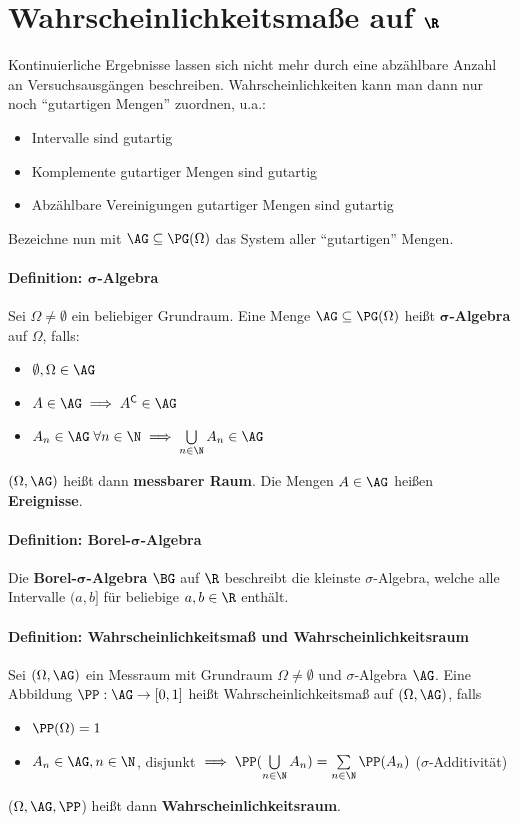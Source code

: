 \section{Wahrscheinlichkeitsmaße auf $\pmb{\R}$}
Kontinuierliche Ergebnisse lassen sich nicht mehr durch eine abzählbare Anzahl an Versuchsausgängen beschreiben.
Wahrscheinlichkeiten kann man dann nur noch \enquote{gutartigen Mengen} zuordnen, u.a.:
\begin{itemize}
	\item Intervalle sind gutartig
	\item Komplemente gutartiger Mengen sind gutartig
	\item Abzählbare Vereinigungen gutartiger Mengen sind gutartig
\end{itemize}
Bezeichne nun mit $\AG\subseteq\PG(\Omega)$ das System aller \enquote{gutartigen} Mengen.

\paragraph{Definition: $\pmb{\sigma}$-Algebra}
Sei $\Omega\neq\emptyset$ ein beliebiger Grundraum. Eine Menge $\AG\subseteq\PG(\Omega)$ heißt $\pmb{\sigma}$\textbf{-Algebra} auf $\Omega$, falls:
\begin{itemize}
	\item $\emptyset,\Omega\in\AG$
	\item $A\in\AG\implies A^{\mathsf{C}}\in\AG$
	\item $A_n\in\AG\;\forall n\in\N\implies\bigcup\limits_{n\in\N}A_n\in\AG$
\end{itemize}
$(\Omega,\AG)$ heißt dann \textbf{messbarer Raum}.
Die Mengen $A\in\AG$ heißen \textbf{Ereignisse}.

\paragraph{Definition: Borel-$\pmb{\sigma}$-Algebra}
Die \textbf{Borel-$\pmb{\sigma}$-Algebra} $\BG$ auf $\R$ beschreibt die kleinste $\sigma$-Algebra, welche alle Intervalle $(a,b]$ für beliebige $a,b\in\R$ enthält.

\paragraph{Definition: Wahrscheinlichkeitsmaß und Wahrscheinlichkeitsraum}
Sei $(\Omega,\AG)$ ein Messraum mit Grundraum $\Omega\neq\emptyset$ und $\sigma$-Algebra $\AG$.
Eine Abbildung $\PP:\AG\rightarrow[0,1]$ heißt Wahrscheinlichkeitsmaß auf $(\Omega,\AG)$, falls
\begin{itemize}
	\item $\PP(\Omega)=1$
	\item $A_n\in\AG,n\in\N$, disjunkt $\implies\PP(\bigcup\limits_{n\in\N}A_n)=\sum\limits_{n\in\N}\PP(A_n)$ \qquad($\sigma$-Additivität)
\end{itemize}
($\Omega,\AG,\PP$) heißt dann \textbf{Wahrscheinlichkeitsraum}.

